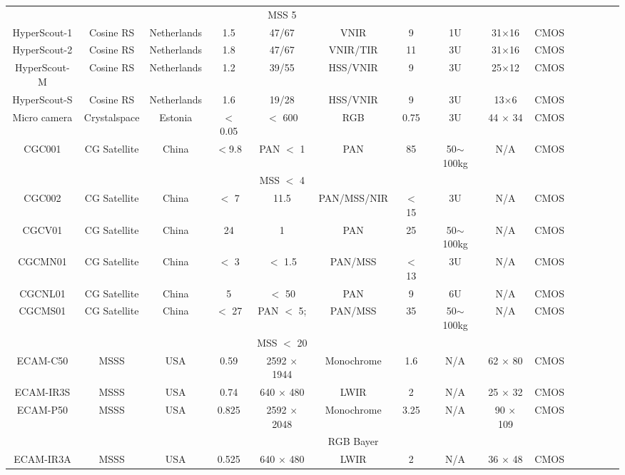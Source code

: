 \documentclass[final,5p,times,twocolumn,authoryear]{elsarticle}
\begin{document}
\begin{table}
{\begin{tabular}{c c c c c c c c c c c c c c c}
			& & & & MSS 5 & &  & & & & & & & \\
			HyperScout-1 & Cosine RS & Netherlands & 1.5 & 47/67 &VNIR & 9  &  1U & 31$\times$16 & CMOS & \citep{cosine2023}\\ 
			HyperScout-2 & Cosine RS & Netherlands & 1.8 & 47/67 & VNIR/TIR & 11 & 3U & 31$\times$16 & CMOS & \citep{cosine2023}\\ 
			HyperScout-M & Cosine RS & Netherlands & 1.2 & 39/55 & HSS/VNIR & 9 &  3U & 25$\times$12 & CMOS & \citep{cosine2023}\\ 
			HyperScout-S & Cosine RS & Netherlands & 1.6 & 19/28 &  HSS/VNIR & 9 &   3U & 13$\times$6 & CMOS & \citep{cosine2023}\\ 
			Micro camera & Crystalspace & Estonia & $<$ 0.05 & $<$ 600 &  RGB & 0.75 & 3U & 44 $\times$ 34 & CMOS & \citep{slavinskis2015estcube}\\ 
			CGC001 & CG Satellite & China & $<$9.8 & PAN $<$ 1  & PAN & 85 &  50$\sim$100kg & N/A & CMOS & \citep{cgsat2023} \\
			& & & & MSS $<$ 4 & &  & & & & & & & \\
			CGC002 & CG Satellite & China & $<$ 7 & 11.5 &  PAN/MSS/NIR & $<$ 15 &  3U & N/A & CMOS & \citep{cgsat2023}\\
			CGCV01 & CG Satellite & China &  24 & 1 & PAN & 25 &  50$\sim$100kg & N/A & CMOS & \citep{cgsat2023} \\
			CGCMN01 & CG Satellite & China & $<$ 3 & $<$ 1.5 &  PAN/MSS & $<$ 13 & 3U & N/A & CMOS & \citep{cgsat2023} \\
			CGCNL01 & CG Satellite & China & 5 & $<$ 50 & PAN & 9 & 6U & N/A & CMOS & \citep{cgsat2023} \\
			CGCMS01 & CG Satellite & China & $<$ 27 & PAN $<$ 5; &  PAN/MSS & 35 &  50$\sim$100kg & N/A & CMOS & \citep{cgsat2023}\\
			& & & & MSS $<$ 20 & &  & & & & & & &  \\    
			ECAM-C50 & MSSS & USA & 0.59 & 2592 $\times$ 1944 & Monochrome & 1.6 &  N/A & 62 $\times$ 80 & CMOS & \citep{malin2023}\\
			ECAM-IR3S & MSSS & USA & 0.74 & 640 $\times$ 480 & LWIR & 2 &  N/A & 25 $\times$ 32 & CMOS & \citep{malin2023}\\
			ECAM-P50 & MSSS & USA & 0.825 & 2592 $\times$ 2048 &  Monochrome & 3.25 & N/A & 90 $\times$ 109 & CMOS & \citep{malin2023}\\
			& & & & &   RGB Bayer & & & & & & & &\\
			ECAM-IR3A & MSSS & USA & 0.525 & 640 $\times$ 480 &  LWIR & 2 &  N/A &  36 $\times$ 48 & CMOS & \citep{malin2023}\\    

\end{tabular}}
\end{table}
\end{document}
